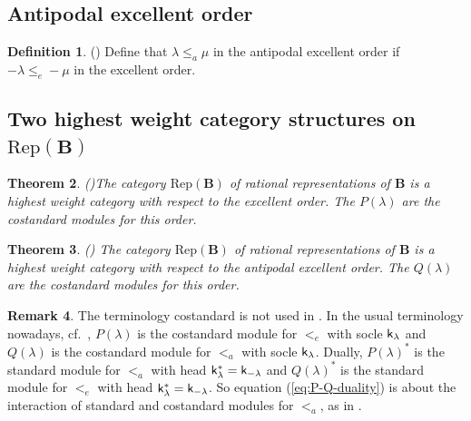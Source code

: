 \documentclass[sn-mathphys-num]{sn-jnl}%
\newcommand{\Rep}{{\mathrm{Rep}}}
\newcommand{\sk}{{\sf k}}
\newcommand{\fb}{\mathbf B}
\newtheorem{theorem}{Theorem}[section]
\theoremstyle{definition}
\newtheorem{definition}[theorem]{Definition}%
\newtheorem{remark}[theorem]{Remark}
\begin{document}
\subsection{Antipodal excellent order}\label{subsec:antipodexcord}

\begin{definition}\label{def:antipodal}(\cite{WvdK})
Define that $\lambda \leq_a \mu$ in the antipodal excellent order if $-\lambda \leq_e -\mu$ in the excellent order.
\end{definition}

\subsection{Two highest weight category structures on $\Rep( \fb)$}\label{subsec:hwc_repB}

\begin{theorem}(\cite[Theorem 1.6, (i)]{WvdK})\label{th:Pexc}
The category  ${\mathrm{Rep} }( \fb)$ of rational representations  of $ \fb
$ is a highest weight category with respect to the excellent order.
The $P(\lambda)$ are the costandard modules
for this order.
\end{theorem}


\begin{theorem}(\cite[Theorem 1.6, (ii)]{WvdK})
The category  ${\mathrm{Rep} }( \fb)$ of rational representations  of $\fb$ is a highest weight category with respect to the antipodal excellent order.
The $Q(\lambda)$ are the costandard modules
for this order.
\end{theorem}

\begin{remark}\label{rem:anti-standard}
The terminology costandard is not used in \cite{WvdK}.  In the usual terminology nowadays, cf.\ \cite[\S 2]{Donsur}, $P(\lambda)$ is the costandard module for $<_e$ with socle $\sk_\lambda$ and $Q(\lambda)$ is the costandard module for $<_a$ with socle $\sk_\lambda$. Dually, $P(\lambda)^*$ is the standard module for $<_a$ with head $\sk_\lambda^*=\sk_{-\lambda}$ and $Q(\lambda)^*$ is the standard module for $<_e$ with head $\sk_\lambda^*=\sk_{-\lambda}$.
So equation (\ref{eq:P-Q-duality}) is about the interaction of standard and costandard modules for $<_a$, as in \cite[Proposition 3.12]{Ef}.
\end{remark}
\end{document}
